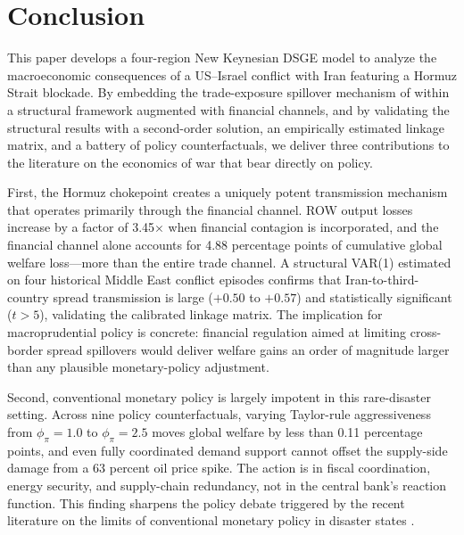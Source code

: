 \documentclass[12pt,a4paper]{article}
\begin{document}

\section{Conclusion}
\label{sec:conclusion}

This paper develops a four-region New Keynesian DSGE model to analyze the macroeconomic consequences of a US--Israel conflict with Iran featuring a Hormuz Strait blockade. By embedding the trade-exposure spillover mechanism of \citet{federle2026price} within a structural framework augmented with financial channels, and by validating the structural results with a second-order solution, an empirically estimated linkage matrix, and a battery of policy counterfactuals, we deliver three contributions to the literature on the economics of war that bear directly on policy.

First, the Hormuz chokepoint creates a uniquely potent transmission mechanism that operates primarily through the financial channel. ROW output losses increase by a factor of 3.45$\times$ when financial contagion is incorporated, and the financial channel alone accounts for 4.88 percentage points of cumulative global welfare loss---more than the entire trade channel. A structural VAR(1) estimated on four historical Middle East conflict episodes confirms that Iran-to-third-country spread transmission is large ($+0.50$ to $+0.57$) and statistically significant ($t > 5$), validating the calibrated linkage matrix. The implication for macroprudential policy is concrete: financial regulation aimed at limiting cross-border spread spillovers would deliver welfare gains an order of magnitude larger than any plausible monetary-policy adjustment.

Second, conventional monetary policy is largely impotent in this rare-disaster setting. Across nine policy counterfactuals, varying Taylor-rule aggressiveness from $\phi_\pi = 1.0$ to $\phi_\pi = 2.5$ moves global welfare by less than 0.11 percentage points, and even fully coordinated demand support cannot offset the supply-side damage from a 63 percent oil price spike. The action is in fiscal coordination, energy security, and supply-chain redundancy, not in the central bank's reaction function. This finding sharpens the policy debate triggered by the recent literature on the limits of conventional monetary policy in disaster states \citep{barro2006rare}.
\end{document}
